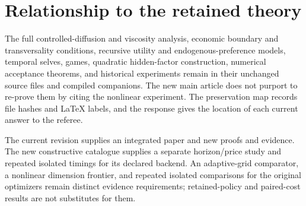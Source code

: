 \documentclass[ecta,nameyear,draft]{econsocart}
\begin{document}
\section{Relationship to the retained theory}
The full controlled-diffusion and viscosity analysis, economic boundary and transversality conditions, recursive utility and endogenous-preference models, temporal selves, games, quadratic hidden-factor construction, numerical acceptance theorems, and historical experiments remain in their unchanged source files and compiled companions. The new main article does not purport to re-prove them by citing the nonlinear experiment. The preservation map records file hashes and LaTeX labels, and the response gives the location of each current answer to the referee.

The current revision supplies an integrated paper and new proofs and evidence. The new constructive catalogue supplies a separate horizon/price study and repeated isolated timings for its declared backend. An adaptive-grid comparator, a nonlinear dimension frontier, and repeated isolated comparisons for the original optimizers remain distinct evidence requirements; retained-policy and paired-cost results are not substitutes for them.




\end{document}
